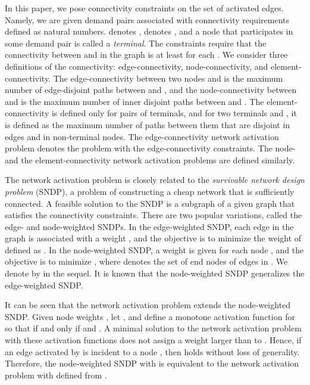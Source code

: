 \documentclass[11pt]{article}
\begin{document}
In this paper, we pose connectivity constraints 
on the set  of activated edges.
Namely, we are given
demand pairs  associated with
connectivity requirements  defined as natural numbers.
 denotes ,  denotes ,
and a node that participates in some demand pair is called a {\em terminal}.
The constraints require that
the connectivity between  and  in
the graph  is at least  for each .
We consider three definitions of the connectivity:
edge-connectivity, node-connectivity, and element-connectivity.
The edge-connectivity between two nodes  and  is the maximum
number of edge-disjoint paths between  and ,
and the node-connectivity 
between  and  is the maximum
number of inner disjoint paths between  and .
The element-connectivity is defined only for pairs of terminals,
and for two terminals  and , it is defined as the maximum number
of paths between them that are disjoint in edges and in non-terminal nodes.
The edge-connectivity network activation problem denotes the problem with the edge-connectivity
constraints.
The node- and the element-connectivity network activation problems 
are defined similarly.

The network activation problem is closely related to
the \emph{survivable network design problem} (SNDP),
a problem of constructing a cheap network that is sufficiently connected.
A feasible solution to the SNDP is a subgraph  of a given graph 
that satisfies the connectivity constraints.
There are two popular variations, called the edge- and
node-weighted SNDPs.
In the edge-weighted SNDP, each edge in the graph is associated with a
weight , and the objective is to minimize the weight  of  defined as
.
In the node-weighted SNDP, 
a weight  is given for each node , and the objective is
to minimize , where  denotes the set of
end nodes of edges in .
We denote  by  in the sequel.
It is known that the node-weighted SNDP generalizes the edge-weighted
SNDP.

It can be seen that the network activation problem extends the node-weighted SNDP.
Given node weights ,
let ,
and define a monotone activation function  for  so that
 if and only if  and .
A minimal solution  to the network activation
problem with these activation functions
does not assign a weight larger than  to .
Hence, if an edge activated by  is incident to a node , 
then  holds without loss of generality.
Therefore, the node-weighted SNDP with  is equivalent to the network activation problem
with  defined from .
\end{document}
